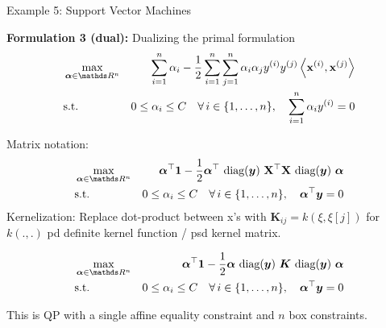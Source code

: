 \documentclass[11pt,compress,t,notes=noshow, xcolor=table]{beamer}
\newcommand{\alphav}{\bm{\alpha}} %
\begin{document}
\begin{frame}{Example 5: Support Vector Machines}

\begin{footnotesize}
\textbf{Formulation 3 (dual): } Dualizing the primal formulation 
\begin{eqnarray*}
	& \max\limits_{\alphav \in \R^n} & \sum_{i=1}^n \alpha_i - \frac{1}{2}\sum_{i=1}^n\sum_{j=1}^n\alpha_i\alpha_j\yi y^{(j)} \scp{\xi}{\xv^{(j)}} \\
	& \text{s.t. } & 0 \le \alpha_i \le C \quad \forall\, i \in \nset, \quad \sum_{i=1}^n \alpha_i \yi = 0
\end{eqnarray*}
\end{footnotesize}


\vspace*{-0.5cm}

\begin{footnotesize}
Matrix notation: 
\begin{eqnarray*}
	& \max\limits_{\alphav \in \R^n} & \bm{\alpha}^\top \bm{1} - \frac{1}{2} \bm{\alpha}^\top ~ \text{diag}(\bm{y}) ~ \Xmat^\top \Xmat ~ \text{diag}(\bm{y})~\bm{\alpha} \\
	& \text{s.t. } & 0 \le \alpha_i \le C \quad \forall\, i \in \nset, \quad \bm{\alpha}^\top \bm{y} = 0
\end{eqnarray*}
Kernelization: Replace dot-product between x's  with $\bm{K}_{ij} = k(\xi, \xi[j])$ for $k(.,.)$ pd definite kernel function / psd kernel matrix. 
\end{footnotesize}


\begin{footnotesize}
\begin{eqnarray*}
	& \max\limits_{\alphav \in \R^n} & \bm{\alpha}^\top \bm{1} - \frac{1}{2} \bm{\alpha} ~ \text{diag}(\bm{y}) ~ \bm{K} ~ \text{diag}(\bm{y})~\bm{\alpha} \\
	& \text{s.t. } & 0 \le \alpha_i \le C \quad \forall\, i \in \nset, \quad \bm{\alpha}^\top \bm{y} = 0
\end{eqnarray*}


\vspace*{0.2cm}

This is QP with a single affine equality constraint and $n$ box constraints. 
\end{footnotesize}

\end{frame}
\end{document}
